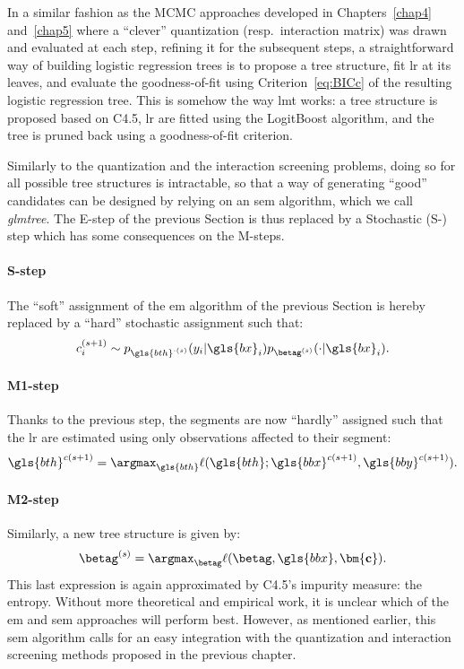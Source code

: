 In a similar fashion as the MCMC approaches developed in Chapters~\ref{chap4} and~\ref{chap5} where a ``clever'' quantization (resp.\ interaction matrix) was drawn and evaluated at each step, refining it for the subsequent steps, a straightforward way of building logistic regression trees is to propose a tree structure, fit \gls{lr} at its leaves, and evaluate the goodness-of-fit using Criterion~\ref{eq:BICc} of the resulting logistic regression tree. This is somehow the way \gls{lmt} works: a tree structure is proposed based on C4.5, \gls{lr} are fitted using the LogitBoost algorithm, and the tree is pruned back using a goodness-of-fit criterion.

Similarly to the quantization and the interaction screening problems, doing so for all possible tree structures is intractable, so that a way of generating ``good'' candidates can be designed by relying on an \gls{sem} algorithm, which we call \textit{glmtree}. The E-step of the previous Section is thus replaced by a Stochastic (S-) step which has some consequences on the M-steps.
\paragraph{S-step} The ``soft'' assignment of the \gls{em} algorithm of the previous Section is hereby replaced by a ``hard'' stochastic assignment such that:
\[ c_i^{(s+1)} \sim p_{\gls{bth}^{\cdot(s)}}(y_i | \gls{bx}_i) p_{\betag^{(s)}}(\cdot | \gls{bx}_i). \]
\paragraph{M1-step} Thanks to the previous step, the segments are now ``hardly'' assigned such that the \gls{lr} are estimated using only observations affected to their segment:
\[ \gls{bth}^{c(s+1)} = \argmax_{\gls{bth}} \ell(\gls{bth};\gls{bbx}^{c(s+1)},\gls{bby}^{c(s+1)}). \]
\paragraph{M2-step} Similarly, a new tree structure is given by:
\[ \betag^{(s)} = \argmax_{\betag} \ell(\betag, \gls{bbx}, \mathbf{\bm{c}}). \]
This last expression is again approximated by C4.5's impurity measure: the entropy. Without more theoretical and empirical work, it is unclear which of the \gls{em} and \gls{sem} approaches will perform best. However, as mentioned earlier, this \gls{sem} algorithm calls for an easy integration with the quantization and interaction screening methods proposed in the previous chapter.

